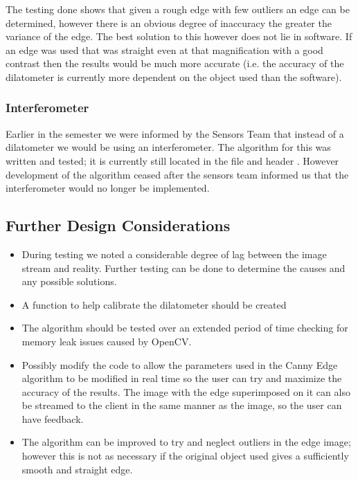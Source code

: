 The testing done shows that given a rough edge with few outliers an edge can be determined, however there is an obvious degree of inaccuracy the greater the variance of the edge. The best solution to this however does not lie in software.  If an edge was used that was straight even at that magnification with a good contrast then the results would be much more accurate (i.e. the accuracy of the dilatometer is currently more dependent on the object used than the software). 
  

\subsubsection{Interferometer}
Earlier in the semester we were informed by the Sensors Team that instead of a dilatometer we would be using an interferometer.  The algorithm for this was written and tested; it is currently still located in the file  and header . However development of the algorithm ceased after the sensors team informed us that the interferometer would no longer be implemented.

\subsection{Further Design Considerations}

\begin{itemize}
	\item During testing we noted a considerable degree of lag between the image stream and reality. Further testing can be done to determine the causes and any possible solutions.
	\item A function to help calibrate the dilatometer should be created
	\item The algorithm should be tested over an extended period of time checking for memory leak issues caused by OpenCV.
	\item Possibly modify the code to allow the parameters used in the Canny Edge algorithm to be modified in real time so the user can try and maximize the accuracy of the results.  The image with the edge superimposed on it can also be streamed to the client in the same manner as the image, so the user can have feedback.

	\item The algorithm can be improved to try and neglect outliers in the edge image; however this is not as necessary if the original object used gives a sufficiently smooth and straight edge.
\end{itemize}

